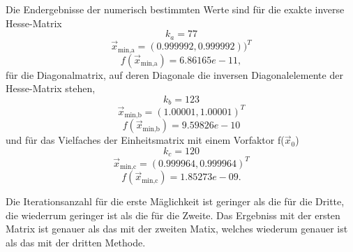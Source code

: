   Die Endergebnisse der numerisch bestimmten Werte sind für die  exakte inverse Hesse-Matrix
  $$k_a = 77 $$
  $$ \vec{x}_\text{min,a}= (0.999992 , 0.999992))^T $$
  $$f(\vec{x}_\text{min,a})=6.86165e-11, $$
  für die Diagonalmatrix, auf deren Diagonale die inversen Diagonalelemente der Hesse-Matrix stehen,
  $$k_b= 123$$
  $$\vec{x}_\text{min,b}=(1.00001 , 1.00001)^T$$
  $$f(\vec{x}_\text{min,b})=9.59826e-10$$
  und für das Vielfaches der Einheitsmatrix mit einem Vorfaktor f($\vec{x}_0$)
  $$k_c= 120$$
  $$\vec{x}_\text{min,c}=(0.999964 , 0.999964)^T$$
  $$ f(\vec{x}_\text{min,c})=1.85273e-09.$$

  Die Iterationsanzahl für die erste Mäglichkeit ist geringer als die für die Dritte, die wiederrum geringer ist als die für die Zweite.
  Das Ergebniss mit der ersten Matrix ist genauer als das mit der zweiten Matix, welches wiederum genauer ist als das mit der dritten Methode.





